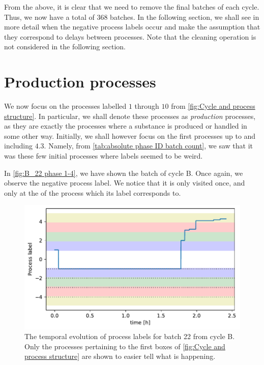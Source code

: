 \documentclass[../Thesis.tex]{subfiles}
\begin{document}
From the above, it is clear that we need to remove the final batches of each cycle. Thus, we now have a total of $368$ batches. In the following section, we shall see in more detail when the negative process labels occur and make the assumption that they correspond to delays between processes. Note that the cleaning operation is not considered in the following section.






\section{Production processes}\label{sec:Data - production processes}
We now focus on the processes labelled $1$ through $10$ from \autoref{fig:Cycle and process structure}. In particular, we shall denote these processes as \textit{production} processes, as they are exactly the processes where a substance is produced or handled in some other way. Initially, we shall however focus on the first processes up to and including $4.3$. Namely, from \autoref{tab:absolute phase ID batch count}, we saw that it was these few initial processes where labels seemed to be weird.

In \autoref{fig:B_22 phase 1-4}, we have shown the  batch of cycle B. Once again, we observe the negative process label. We notice that it is only visited once, and only at the of the process which its label corresponds to.

\begin{figure}[h]
    \centering
    \includegraphics[width=.83\linewidth]{figures/Multiple cycles data/Adding of solids/B_22 long waiting.pdf}
    \caption{The temporal evolution of process labels for batch 22 from cycle B. Only the processes pertaining to the first boxes of \autoref{fig:Cycle and process structure} are shown to easier tell what is happening.}
    \label{fig:B_22 phase 1-4}
\end{figure}
\end{document}
